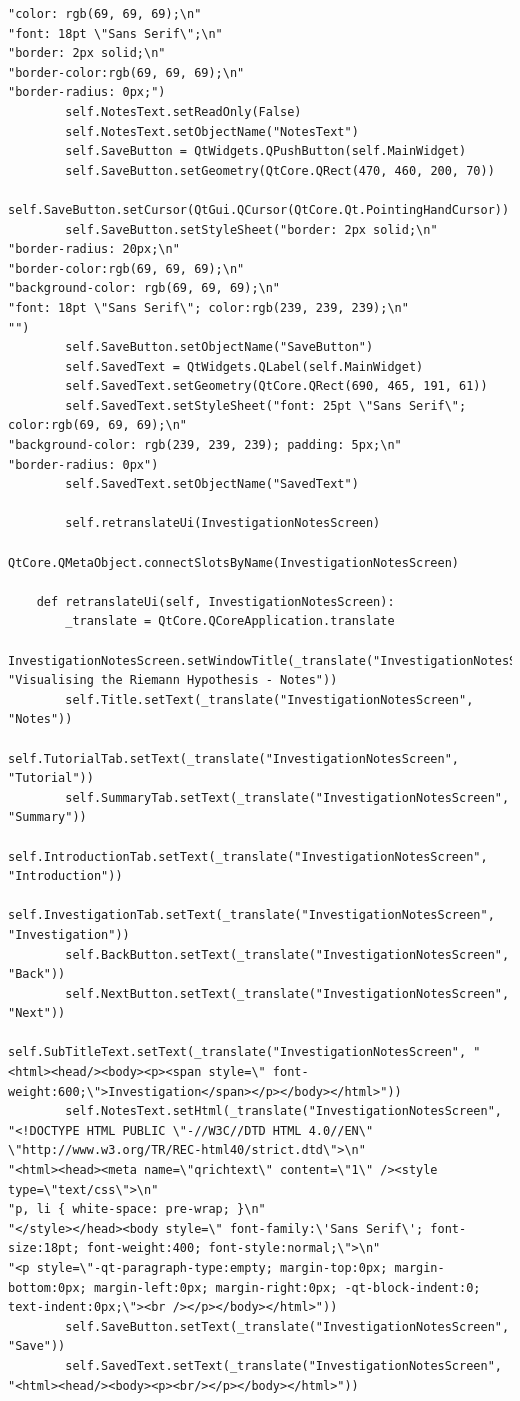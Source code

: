 \documentclass{article}
\begin{document}
\begin{lstlisting}
"color: rgb(69, 69, 69);\n"
"font: 18pt \"Sans Serif\";\n"
"border: 2px solid;\n"
"border-color:rgb(69, 69, 69);\n"
"border-radius: 0px;")
        self.NotesText.setReadOnly(False)
        self.NotesText.setObjectName("NotesText")
        self.SaveButton = QtWidgets.QPushButton(self.MainWidget)
        self.SaveButton.setGeometry(QtCore.QRect(470, 460, 200, 70))
        self.SaveButton.setCursor(QtGui.QCursor(QtCore.Qt.PointingHandCursor))
        self.SaveButton.setStyleSheet("border: 2px solid;\n"
"border-radius: 20px;\n"
"border-color:rgb(69, 69, 69);\n"
"background-color: rgb(69, 69, 69);\n"
"font: 18pt \"Sans Serif\"; color:rgb(239, 239, 239);\n"
"")
        self.SaveButton.setObjectName("SaveButton")
        self.SavedText = QtWidgets.QLabel(self.MainWidget)
        self.SavedText.setGeometry(QtCore.QRect(690, 465, 191, 61))
        self.SavedText.setStyleSheet("font: 25pt \"Sans Serif\"; color:rgb(69, 69, 69);\n"
"background-color: rgb(239, 239, 239); padding: 5px;\n"
"border-radius: 0px")
        self.SavedText.setObjectName("SavedText")

        self.retranslateUi(InvestigationNotesScreen)
        QtCore.QMetaObject.connectSlotsByName(InvestigationNotesScreen)

    def retranslateUi(self, InvestigationNotesScreen):
        _translate = QtCore.QCoreApplication.translate
        InvestigationNotesScreen.setWindowTitle(_translate("InvestigationNotesScreen", "Visualising the Riemann Hypothesis - Notes"))
        self.Title.setText(_translate("InvestigationNotesScreen", "Notes"))
        self.TutorialTab.setText(_translate("InvestigationNotesScreen", "Tutorial"))
        self.SummaryTab.setText(_translate("InvestigationNotesScreen", "Summary"))
        self.IntroductionTab.setText(_translate("InvestigationNotesScreen", "Introduction"))
        self.InvestigationTab.setText(_translate("InvestigationNotesScreen", "Investigation"))
        self.BackButton.setText(_translate("InvestigationNotesScreen", "Back"))
        self.NextButton.setText(_translate("InvestigationNotesScreen", "Next"))
        self.SubTitleText.setText(_translate("InvestigationNotesScreen", "<html><head/><body><p><span style=\" font-weight:600;\">Investigation</span></p></body></html>"))
        self.NotesText.setHtml(_translate("InvestigationNotesScreen", "<!DOCTYPE HTML PUBLIC \"-//W3C//DTD HTML 4.0//EN\" \"http://www.w3.org/TR/REC-html40/strict.dtd\">\n"
"<html><head><meta name=\"qrichtext\" content=\"1\" /><style type=\"text/css\">\n"
"p, li { white-space: pre-wrap; }\n"
"</style></head><body style=\" font-family:\'Sans Serif\'; font-size:18pt; font-weight:400; font-style:normal;\">\n"
"<p style=\"-qt-paragraph-type:empty; margin-top:0px; margin-bottom:0px; margin-left:0px; margin-right:0px; -qt-block-indent:0; text-indent:0px;\"><br /></p></body></html>"))
        self.SaveButton.setText(_translate("InvestigationNotesScreen", "Save"))
        self.SavedText.setText(_translate("InvestigationNotesScreen", "<html><head/><body><p><br/></p></body></html>"))
\end{lstlisting}
\end{document}
